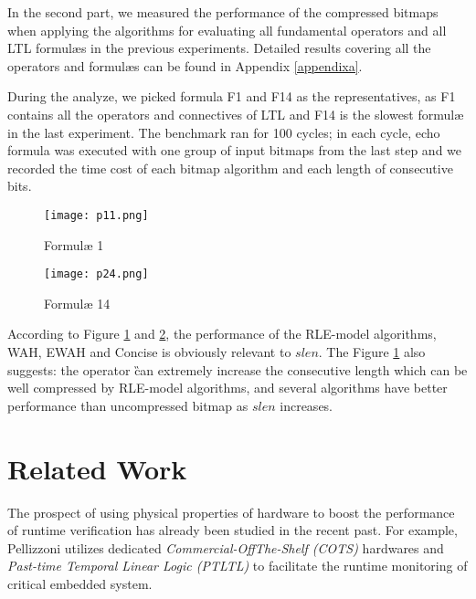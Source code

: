 In the second part, we measured the performance of the compressed bitmaps when applying the algorithms for evaluating all fundamental operators and all LTL formul\ae{}s in the previous experiments. Detailed results covering all the operators and formul\ae{}s can be found in Appendix \ref{appendixa}.

During the analyze, we picked formula F1 and F14 as the representatives, as F1 contains all the operators and connectives of LTL and F14 is the slowest formul\ae{} in the last experiment. The benchmark ran for 100 cycles; in each cycle, echo formula was executed with one group of input bitmaps from the last step and we recorded the time cost of each bitmap algorithm and each length of consecutive bits.

\begin{figure}[h]
\begin{center}
\centering
\texttt{[image: p11.png]}
\caption{Formul\ae{} 1}
\label{img:f1}
\end{center}
\end{figure}

\begin{figure}[h]
\begin{center}
\centering
\texttt{[image: p24.png]}
\caption{Formul\ae{} 14}
\label{img:f14}
\end{center}
\end{figure}

According to Figure \ref{img:f1} and \ref{img:f14}, the performance of the RLE-model algorithms, WAH, EWAH and Concise is obviously relevant to $slen$. The Figure \ref{img:f1} also suggests: the operator \G can extremely increase the consecutive length which can be well compressed by RLE-model algorithms, and several algorithms have better performance than uncompressed bitmap as $slen$ increases.



\section{Related Work}\label{sec:bm:related} %

The prospect of using physical properties of hardware to boost the performance of runtime verification has already been studied in the recent past. For example, Pellizzoni \etal\@ \cite{pellizzoni2008hardware} utilizes dedicated \emph{Commercial-OffThe-Shelf
(COTS) } hardwares and \emph{Past-time Temporal Linear Logic (PTLTL)} \citep{emerson1990temporal} to facilitate the runtime monitoring of critical embedded system.

